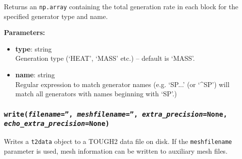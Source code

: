 Returns an \texttt{np.array} containing the total generation rate in each block for the specified generator type and name.

\textbf{Parameters:}
\begin{itemize}
\item \textbf{type}: string\\
  Generation type (`HEAT', `MASS' etc.) -- default is `MASS'.
\item \textbf{name}: string\\
  Regular expression to match generator names (e.g. `SP...' (or `\^{}SP') will match all generators with names beginning with `SP'.)
\end{itemize}

\begin{snugshade}
\subsubsection{\texttt{write(\emph{filename}='', \emph{meshfilename}='', \emph{extra\_precision}=None,\\
    \emph{echo\_extra\_precision}=None)}}
\end{snugshade}
\label{sec:t2data:write}

Writes a \texttt{t2data} object to a TOUGH2 data file on disk.  If the \texttt{meshfilename} parameter is used, mesh information can be written to auxiliary mesh files.

